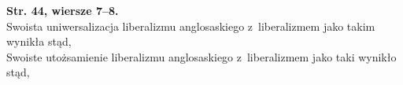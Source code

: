 \documentclass[a4paper,11pt]{article}
\begin{document}
\begin{center}

\end{center}

\vspace{\spaceTwo}


\noindent
\textbf{Str. 44, wiersze 7--8.} \\
\Jest  Swoista uniwersalizacja liberalizmu anglosaskiego z~liberalizmem
jako takim wynikła stąd, \\
\Powin Swoiste utożsamienie liberalizmu anglosaskiego z~liberalizmem
jako taki wynikło stąd, \\
\end{document}
